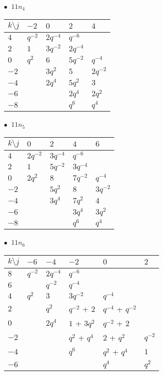 %
\begin{minipage}{\linewidth}
$\bullet\ $ $11n_{4}$ \vspace{0.5em} \\
\begin{tabular}{l|llll}
$k \setminus j$ & $-2$ & $0$ & $2$ & $4$ \\
\hline
$4$ & $q^{-2}$ & $2q^{-4}$ & $q^{-6}$ &  \\
$2$ & $1$ & $3q^{-2}$ & $2q^{-4}$ &  \\
$0$ & $q^{2}$ & $6$ & $5q^{-2}$ & $q^{-4}$ \\
$-2$ &  & $3q^{2}$ & $5$ & $2q^{-2}$ \\
$-4$ &  & $2q^{4}$ & $5q^{2}$ & $3$ \\
$-6$ &  &  & $2q^{4}$ & $2q^{2}$ \\
$-8$ &  &  & $q^{6}$ & $q^{4}$ \\
\end{tabular}
\vspace{2em}
\end{minipage}
%
\begin{minipage}{\linewidth}
$\bullet\ $ $11n_{5}$ \vspace{0.5em} \\
\begin{tabular}{l|llll}
$k \setminus j$ & $0$ & $2$ & $4$ & $6$ \\
\hline
$4$ & $2q^{-2}$ & $3q^{-4}$ & $q^{-6}$ &  \\
$2$ & $1$ & $5q^{-2}$ & $3q^{-4}$ &  \\
$0$ & $2q^{2}$ & $8$ & $7q^{-2}$ & $q^{-4}$ \\
$-2$ &  & $5q^{2}$ & $8$ & $3q^{-2}$ \\
$-4$ &  & $3q^{4}$ & $7q^{2}$ & $4$ \\
$-6$ &  &  & $3q^{4}$ & $3q^{2}$ \\
$-8$ &  &  & $q^{6}$ & $q^{4}$ \\
\end{tabular}
\vspace{2em}
\end{minipage}
%
\begin{minipage}{\linewidth}
$\bullet\ $ $11n_{6}$ \vspace{0.5em} \\
\begin{tabular}{l|lllll}
$k \setminus j$ & $-6$ & $-4$ & $-2$ & $0$ & $2$ \\
\hline
$8$ & $q^{-2}$ & $2q^{-4}$ & $q^{-6}$ &  &  \\
$6$ &  & $q^{-2}$ & $q^{-4}$ &  &  \\
$4$ & $q^{2}$ & $3$ & $3q^{-2}$ & $q^{-4}$ &  \\
$2$ &  & $q^{2}$ & $q^{-2}$ + $2$ & $q^{-4}$ + $q^{-2}$ &  \\
$0$ &  & $2q^{4}$ & $1$ + $3q^{2}$ & $q^{-2}$ + $2$ &  \\
$-2$ &  &  & $q^{2}$ + $q^{4}$ & $2$ + $q^{2}$ & $q^{-2}$ \\
$-4$ &  &  & $q^{6}$ & $q^{2}$ + $q^{4}$ & $1$ \\
$-6$ &  &  &  & $q^{4}$ & $q^{2}$ \\
\end{tabular}
\vspace{2em}
\end{minipage}
